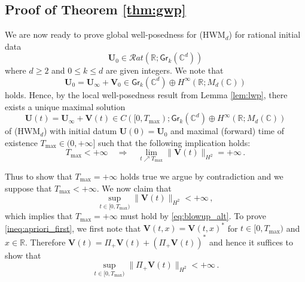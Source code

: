 \documentclass[11pt,reqno]{amsart}
\theoremstyle{definition}
\theoremstyle{remark}
\theoremstyle{remark}
\numberwithin{equation}{section}
\newcommand{\C}{\mathbb{C}}
\newcommand{\R}{\mathbb{R}}
\newcommand{\be}{\begin{equation}}
\newcommand{\ee}{\end{equation}}
\newcommand{\Vb}{\mathbf{V}}
\newcommand{\Ub}{\mathbf{U}}
\newcommand{\Gr}{\mathsf{Gr}}
\begin{document}
\subsection*{Proof of Theorem \ref{thm:gwp}}

We are now ready to prove global well-posedness for (HWM$_d$) for rational initial data
$$
\Ub_0 \in \mathcal{R}at(\R; \Gr_k(\C^d))
$$
where $d \geq 2$ and $0 \leq k \leq d$ are given integers. We note that
$$
\Ub_0 = \Ub_\infty + \Vb_0 \in \Gr_k(\C^d) \oplus H^\infty(\R; M_d(\C))
$$
holds. Hence, by the local well-posedness result from Lemma \ref{lem:lwp}, there exists a unique maximal solution 
$$
\Ub(t) = \Ub_\infty + \Vb(t) \in C([0,T_{\max}); \Gr_k(\C^d) \oplus H^\infty(\R; M_d(\C))
$$
of (HWM$_d$) with initial datum $\Ub(0) = \Ub_0$ and maximal (forward) time of existence $T_{\max} \in (0, +\infty]$ such that the following implication holds:
\be \label{eq:blowup_alt}
T_{\max} < +\infty \quad \Rightarrow \quad \lim_{t \nearrow T_{\max}} \| \Vb(t) \|_{H^2} = +\infty \, .
\ee

Thus to show that $T_{\max} = +\infty$ holds true we argue by contradiction and we suppose that $T_{\max} < +\infty$. We now claim that
\be \label{ineq:apriori_first}
\sup_{t \in [0,T_{\max})} \| \Vb(t) \|_{H^2} < +\infty \, ,
\ee
which  implies that $T_{\max} = +\infty$ must hold by \eqref{eq:blowup_alt}. To prove \eqref{ineq:apriori_first},  we first note that $\Vb(t,x)=\Vb(t,x)^*$ for $t \in [0,T_{\max})$ and $x \in \R$. Therefore $\Vb(t) = \Pi_+ \Vb(t) + (\Pi_+ \Vb(t))^*$ and hence it suffices to show that
\be \label{ineq:apriori}
\sup_{t \in [0,T_{\max})} \| \Pi_+ \Vb(t) \|_{H^2} < +\infty \, .
\ee
\end{document}
